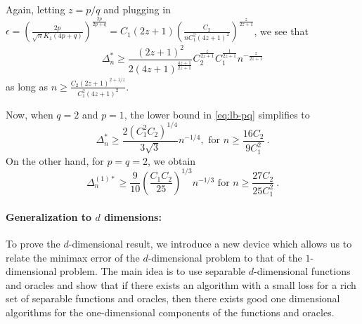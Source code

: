 Again, letting $z=p/q$ and plugging in $\epsilon = \left(\frac{2p}{\sqrt{n} K_1(4p+q)} \right)^{\frac{2p}{2p+q}}=
C_1 (2z+1)\left(\frac{C_2}{n C_1^2(4 z+1)^2}\right)^{\frac{z}{2z+1}}$, we see that \begin{align}
\Delta_n^* \ge \dfrac{\left(2z+1\right)^2}{2\left(4z+1\right)^{\tfrac{4z+1}{2z+1}}}C_2^{\tfrac{z}{2z+1}} C_1^{\frac{1}{2z+1}} n^{-\tfrac{z}{2z+1}}
\label{eq:lb-pq}
\end{align}
as long as $n \ge \frac{C_2 (2z+1)^{2+1/z}}{C_1^2 (4z+1)^2}$.

Now, when $q=2$ and $p=1$, the lower bound in \eqref{eq:lb-pq} simplifies to 
\[
\Delta_n^{*} \ge \dfrac{ 2(C_1^2C_2)^{1/4}}{3\sqrt{3}} n^{-1/4}, \text{ for } n \ge \frac{16C_2}{9 C_1^2}~.
\]
On the other hand, for $p=q=2$, we obtain 
\[
\Delta_n^{(1)*} \ge  \frac{9}{10}\left(\frac{C_1 C_2}{25}\right)^{1/3} n^{-1/3} \text{ for } n \ge \frac{27 C_2}{25 C_1^2}~.
\]


\paragraph{Generalization to $d$ dimensions:}
To prove the $d$-dimensional result, we introduce a new device which allows us to relate the minimax error of the $d$-dimensional problem to that of the $1$-dimensional problem.
The main idea is to use separable $d$-dimensional functions and oracles and show that if there exists an algorithm with a small loss for a rich set of separable functions and oracles, then there exists good one dimensional algorithms for the one-dimensional components of the functions and oracles.

